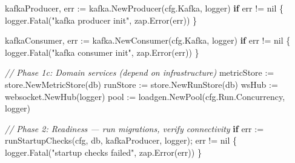 \documentclass[
]{article}
\newenvironment{Shaded}{}{}
\newcommand{\CommentTok}[1]{\textcolor[rgb]{0.38,0.63,0.69}{\textit{#1}}}
\newcommand{\ControlFlowTok}[1]{\textcolor[rgb]{0.00,0.44,0.13}{\textbf{#1}}}
\newcommand{\NormalTok}[1]{#1}
\newcommand{\OperatorTok}[1]{\textcolor[rgb]{0.40,0.40,0.40}{#1}}
\newcommand{\OtherTok}[1]{\textcolor[rgb]{0.00,0.44,0.13}{#1}}
\newcommand{\StringTok}[1]{\textcolor[rgb]{0.25,0.44,0.63}{#1}}
\begin{document}
\begin{Shaded}
\begin{Highlighting}[]
\NormalTok{    kafkaProducer}\OperatorTok{,}\NormalTok{ err }\OperatorTok{:=}\NormalTok{ kafka}\OperatorTok{.}\NormalTok{NewProducer}\OperatorTok{(}\NormalTok{cfg}\OperatorTok{.}\NormalTok{Kafka}\OperatorTok{,}\NormalTok{ logger}\OperatorTok{)}
    \ControlFlowTok{if}\NormalTok{ err }\OperatorTok{!=} \OtherTok{nil} \OperatorTok{\{}
\NormalTok{        logger}\OperatorTok{.}\NormalTok{Fatal}\OperatorTok{(}\StringTok{"kafka producer init"}\OperatorTok{,}\NormalTok{ zap}\OperatorTok{.}\NormalTok{Error}\OperatorTok{(}\NormalTok{err}\OperatorTok{))}
    \OperatorTok{\}}

\NormalTok{    kafkaConsumer}\OperatorTok{,}\NormalTok{ err }\OperatorTok{:=}\NormalTok{ kafka}\OperatorTok{.}\NormalTok{NewConsumer}\OperatorTok{(}\NormalTok{cfg}\OperatorTok{.}\NormalTok{Kafka}\OperatorTok{,}\NormalTok{ logger}\OperatorTok{)}
    \ControlFlowTok{if}\NormalTok{ err }\OperatorTok{!=} \OtherTok{nil} \OperatorTok{\{}
\NormalTok{        logger}\OperatorTok{.}\NormalTok{Fatal}\OperatorTok{(}\StringTok{"kafka consumer init"}\OperatorTok{,}\NormalTok{ zap}\OperatorTok{.}\NormalTok{Error}\OperatorTok{(}\NormalTok{err}\OperatorTok{))}
    \OperatorTok{\}}

    \CommentTok{// Phase 1c: Domain services (depend on infrastructure)}
\NormalTok{    metricStore  }\OperatorTok{:=}\NormalTok{ store}\OperatorTok{.}\NormalTok{NewMetricStore}\OperatorTok{(}\NormalTok{db}\OperatorTok{)}
\NormalTok{    runStore     }\OperatorTok{:=}\NormalTok{ store}\OperatorTok{.}\NormalTok{NewRunStore}\OperatorTok{(}\NormalTok{db}\OperatorTok{)}
\NormalTok{    wsHub        }\OperatorTok{:=}\NormalTok{ websocket}\OperatorTok{.}\NormalTok{NewHub}\OperatorTok{(}\NormalTok{logger}\OperatorTok{)}
\NormalTok{    pool         }\OperatorTok{:=}\NormalTok{ loadgen}\OperatorTok{.}\NormalTok{NewPool}\OperatorTok{(}\NormalTok{cfg}\OperatorTok{.}\NormalTok{Run}\OperatorTok{.}\NormalTok{Concurrency}\OperatorTok{,}\NormalTok{ logger}\OperatorTok{)}

    \CommentTok{// Phase 2: Readiness — run migrations, verify connectivity}
    \ControlFlowTok{if}\NormalTok{ err }\OperatorTok{:=}\NormalTok{ runStartupChecks}\OperatorTok{(}\NormalTok{cfg}\OperatorTok{,}\NormalTok{ db}\OperatorTok{,}\NormalTok{ kafkaProducer}\OperatorTok{,}\NormalTok{ logger}\OperatorTok{);}\NormalTok{ err }\OperatorTok{!=} \OtherTok{nil} \OperatorTok{\{}
\NormalTok{        logger}\OperatorTok{.}\NormalTok{Fatal}\OperatorTok{(}\StringTok{"startup checks failed"}\OperatorTok{,}\NormalTok{ zap}\OperatorTok{.}\NormalTok{Error}\OperatorTok{(}\NormalTok{err}\OperatorTok{))}
    \OperatorTok{\}}


\end{Highlighting}
\end{Shaded}
\end{document}
